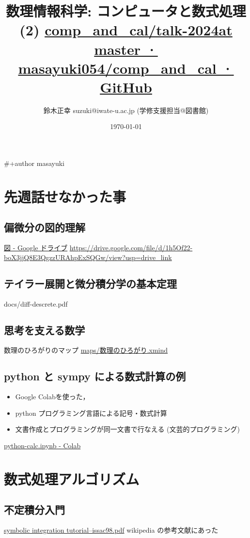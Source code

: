 \documentclass[dvipdfmx,11pat]{jarticle}
\author{鈴木正幸 suzuki@iwate-u.ac.jp (学修支援担当@図書館)}
\date{\today}
\title{  数理情報科学: コンピュータと数式処理 (2) \href{https://github.com/masayuki054/comp\_and\_cal/tree/master/talk-2024}{comp\_and\_cal/talk-2024at master · masayuki054/comp\_and\_cal · GitHub}}
\begin{document}
\maketitle
\#+author masayuki
\section{先週話せなかった事}
\label{sec:org763011d}

\subsection{偏微分の図的理解}
\label{sec:orgc0cf19a}
\href{https://drive.google.com/drive/folders/1lY6qb2Z02iAD\_WdesHNMpmsGecY3ynDa}{図 - Google ドライブ}
\url{https://drive.google.com/file/d/1h5Of22-boX3jjQ8E3QgzzURAhpExSQGw/view?usp=drive\_link}
\subsection{テイラー展開と微分積分学の基本定理}
\label{sec:orgae83a31}
docs/diff-descrete.pdf
\subsection{思考を支える数学}
\label{sec:org6049cfd}
数理のひろがりのマップ \url{maps/数理のひろがり.xmind}
\subsection{python と sympy による数式計算の例}
\label{sec:org482f54b}
\begin{itemize}
\item Google Colabを使った，
\item python プログラミング言語による記号・数式計算
\item 文書作成とプログラミングが同一文書で行なえる (文芸的プログラミング)
\end{itemize}
\href{https://colab.research.google.com/drive/13-xrzx125aD3L4mzB5BhOHAUyLeV6kCX}{python-calc.ipynb - Colab} 
\section{数式処理アルゴリズム}
\label{sec:org534d061}
\subsection{不定積分入門}
\label{sec:orgd2a3d2f}
\href{http://www-sop.inria.fr/cafe/Manuel.Bronstein/publications/issac98.pdf}{symbolic integration tutorial--issac98.pdf}
wikipedia の参考文献にあった
\end{document}
